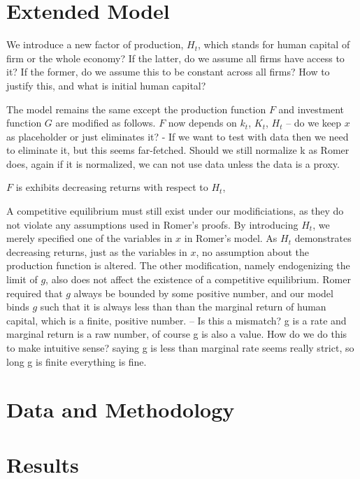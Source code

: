 \documentclass{amsart}
\begin{document}
\section{Extended Model}

We introduce a new factor of production, $H_t$, which stands for human capital of firm or the whole economy? If the latter, do we assume all firms have access to it? If the former, do we assume this to be constant across all firms? How to justify this, and what is initial human capital?

The model remains the same except the production function $F$ and investment function $G$ are modified as follows. $F$ now depends on $k_t$, $K_t$, $H_t$ -- do we keep $x$ as placeholder or just eliminates it? - If we want to test with data then we need to eliminate it, but this seems far-fetched. Should we still normalize k as Romer does, again if it is normalized, we can not use data unless the data is a proxy. 

$F$ is exhibits decreasing returns with respect to $H_t$, 

A competitive equilibrium must still exist under our modificiations, as they do not violate any assumptions used in Romer's proofs. By introducing $H_t$, we merely specified one of the variables in $x$ in Romer's model. As $H_t$ demonstrates decreasing returns, just as the variables in $x$, no assumption about the production function is altered. The other modification, namely endogenizing the limit of $g$, also does not affect the existence of a competitive equilibrium. Romer required that $g$ always be bounded by some positive number, and our model binds $g$ such that it is always less than than the marginal return of human capital, which is a finite, positive number. -- Is this a mismatch? g is a rate and marginal return is a raw number, of course g is also a value. How do we do this to make intuitive sense? saying g is less than marginal rate seems really strict, so long g is finite everything is fine. 

\section{Data and Methodology}

\section{Results}


\printbibliography
\end{document}
